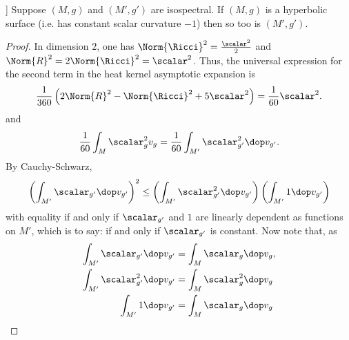 \begin{proposition}[prop. E.IV.15 in]\cite{Berger.Gauduchon.Mazet-[SpectreVarieteRiemannienne]1971a}]
  Suppose  $(M,g)$ and $(M',g')$ are isospectral. If $(M,g)$ is  a hyperbolic surface (i.e. has constant scalar curvature $-1$)  then so too is $(M',g')$.
\end{proposition}
\begin{proof}
  In dimension $2$, one has $\Norm{\Ricci}^2 = \frac{\scalar^2}{2}$ and $\Norm{R}^2 = 2 \Norm{\Ricci}^2 = \scalar^2$. Thus, the universal expression for the second term in the heat kernel asymptotic expansion is
  \begin{align}
    \frac{1}{360}\left(2\Norm{R}^2 - \Norm{\Ricci}^2 + 5 \scalar^2\right) =\frac{1}{60} \scalar^2.
  \end{align}
  and
  \begin{align}
    \frac{1}{60} \int_M \scalar_{g}^2 v_g = \frac{1}{60} \int_{M'} \scalar_{g'}^2 \dop v_{g'}.
  \end{align}
  By Cauchy-Schwarz,
  \begin{align}
    \left( \int_{M'} \scalar_{g'} \dop v_{g'} \right)^2 \leq \left( \int_{M'} \scalar_{g'}^2 \dop v_{g'} \right)\left( \int_{M'} 1 \dop v_{g'} \right)
  \end{align}
  with equality if and only if $\scalar_{g'}$ and $1$ are linearly dependent as functions on $M'$, which is to say: if and only if $\scalar_{g'}$ is constant. Now note that, as
  \begin{align}
    \int_{M'}\scalar_{g'}\dop v_{g'}   & =\int_{M}\scalar_{g}\dop v_{g},  \\
    \int_{M'}\scalar_{g'}^2\dop v_{g'} & =\int_{M}\scalar_{g}^2\dop v_{g} \\
    \int_{M'}1\dop v_{g'}   & =\int_{M}\scalar_{g}\dop v_{g}
  \end{align}
\end{proof}
\newpage



